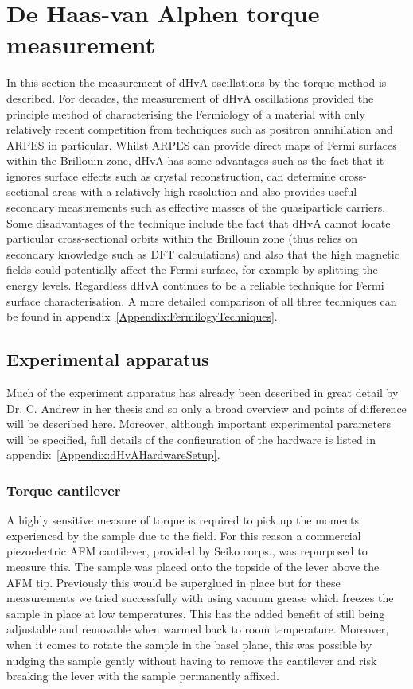 
\section{De Haas-van Alphen torque measurement}

In this section the measurement of \ac{dHvA} oscillations by the torque method is described. For decades, the measurement of \ac{dHvA} oscillations provided the principle method of characterising the Fermiology of a material with only relatively recent competition from techniques such as positron annihilation and \ac{ARPES} in particular. Whilst \ac{ARPES} can provide direct maps of Fermi surfaces within the Brillouin zone, \ac{dHvA} has some advantages such as the fact that it ignores surface effects such as crystal reconstruction, can determine cross-sectional areas with a relatively high resolution and also provides useful secondary measurements such as effective masses of the quasiparticle carriers.  Some disadvantages of the technique include the fact that \ac{dHvA} cannot locate particular cross-sectional orbits within the Brillouin zone (thus relies on secondary knowledge such as \ac{DFT} calculations) and also that the high magnetic fields could potentially affect the Fermi surface, for example by splitting the energy levels. Regardless \ac{dHvA} continues to be a reliable technique for Fermi surface characterisation. A more detailed comparison of all three techniques can be found in appendix~\ref{Appendix:FermilogyTechniques}.

\subsection{Experimental apparatus}

Much of the experiment apparatus has already been described in great detail by Dr. C. Andrew in her thesis\cite{Andrew2010} and so only a broad overview and points of difference will be described here. Moreover, although important experimental parameters will be specified, full details of the configuration of the hardware is listed in appendix~\ref{Appendix:dHvAHardwareSetup}.

\subsubsection{Torque cantilever}

A highly sensitive measure of torque is required to pick up the moments experienced by the sample due to the field. For this reason a commercial piezoelectric \ac{AFM} cantilever, provided by Seiko corps., was repurposed to measure this. The sample was placed onto the topside of the lever above the \ac{AFM} tip. Previously this would be superglued in place but for these measurements we tried successfully with using vacuum grease which freezes the sample in place at low temperatures. This has the added benefit of still being adjustable and removable when warmed back to room temperature. Moreover, when it comes to rotate the sample in the basel plane, this was possible by nudging the sample gently without having to remove the cantilever and risk breaking the lever with the sample permanently affixed.

